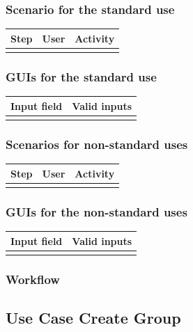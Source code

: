 \documentclass[12pt]{article}
\theoremstyle{definition}
\begin{document}
\subsubsection{Scenario for the standard use}

\begin{tabular}{|l|l|l|}
\hline
Step & User & Activity \\ \hline
 & & \\ \hline
\end{tabular}

\subsubsection{GUIs for the standard use}

\begin{tabular}{|l|l|}
\hline
Input field & Valid inputs \\ \hline
 &  \\ \hline
\end{tabular}

\subsubsection{Scenarios for non-standard uses}

\begin{tabular}{|l|l|l|}
\hline
Step & User & Activity \\ \hline
 & & \\ \hline
\end{tabular}

\subsubsection{GUIs for the non-standard uses}

\begin{tabular}{|l|l|}
\hline
Input field & Valid inputs \\ \hline
 &  \\ \hline
\end{tabular}

\subsubsection{Workflow}

\subsection{Use Case Create Group}
\end{document}
